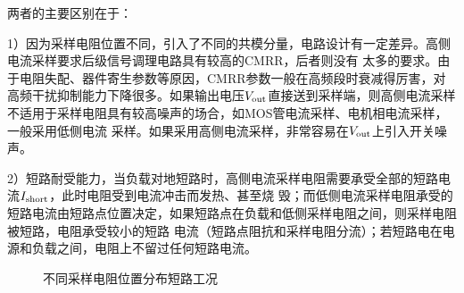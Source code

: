 \documentclass[UTF8]{ctexart}
\numberwithin{equation}{section} %
\numberwithin{figure}{section}
\begin{document}
    两者的主要区别在于：

    1）因为采样电阻位置不同，引入了不同的共模分量，电路设计有一定差异。高侧电流采样要求后级信号调理电路具有较高的CMRR，后者则没有
    太多的要求。由于电阻失配、器件寄生参数等原因，CMRR参数一般在高频段时衰减得厉害，对高频干扰抑制能力下降很多。如果输出电压$V_
    {\rm out}$直接送到采样端，则高侧电流采样不适用于采样电阻具有较高噪声的场合，如MOS管电流采样、电机相电流采样，一般采用低侧电流
    采样。如果采用高侧电流采样，非常容易在$V_{\rm out}$上引入开关噪声。

    2）短路耐受能力，当负载对地短路时，高侧电流采样电阻需要承受全部的短路电流$I_{\rm short}$，此时电阻受到电流冲击而发热、甚至烧
    毁；而低侧电流采样电阻承受的短路电流由短路点位置决定，如果短路点在负载和低侧采样电阻之间，则采样电阻被短路，电阻承受较小的短路
    电流（短路点阻抗和采样电阻分流）；若短路电在电源和负载之间，电阻上不留过任何短路电流。

    \begin{figure}[H]
        \centering
        \caption{不同采样电阻位置分布短路工况}
        \label{f2.3}
    \end{figure}
    
\end{document}
